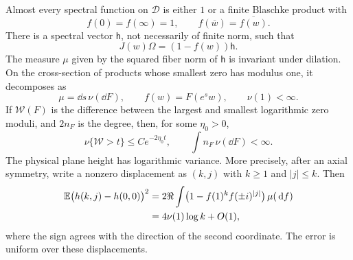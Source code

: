 \begin{proposition}\label{prop:spectral}
Almost every spectral function on $\mathcal D$ is either $1$ or a
finite Blaschke product with
\begin{equation}\label{eq:finite-spectral-inner}
 f(0)=f(\infty)=1,
 \qquad f(\overline w)=\overline{f(w)}.
\end{equation}
There is a spectral vector $\mathsf h$, not necessarily of finite
norm, such that
\begin{equation}\label{eq:current-cocycle}
 J(w)\Omega=(1-f(w))\mathsf h.
\end{equation}
The measure $\mu$ given by the squared fiber norm of $\mathsf h$
is invariant under dilation.  On the cross-section of products whose
smallest zero has modulus one, it decomposes as
\begin{equation}\label{eq:current-disintegration}
 \mu=\dd s\,\nu(\dd F),\qquad f(w)=F(e^s w),
 \qquad \nu(1)<\infty.
\end{equation}
If $\mathcal W(F)$ is the difference between the largest and smallest
logarithmic zero moduli, and $2n_F$ is the degree, then, for some
$\eta_0>0$,
\begin{equation}\label{eq:current-width-tail}
 \nu\{\mathcal W>t\}\le C e^{-2\eta_0t},\qquad
 \int n_F\,\nu(\dd F)<\infty.
\end{equation}
The physical plane height has logarithmic variance.  More precisely,
after an axial symmetry, write a nonzero displacement as $(k,j)$ with
$k\ge1$ and $|j|\le k$.  Then
\begin{equation}\label{eq:spectral-variogram}
 \begin{split}
 \mathbb E\bigl(h(k,j)-h(0,0)\bigr)^2
 &=2\Re\int\bigl(1-f(1)^k f(\pm i)^{|j|}\bigr)\,\mu(\,\mathrm d f)\\
 &=4\nu(1)\log k+O(1),
 \end{split}
\end{equation}
where the sign agrees with the direction of the second coordinate.
The error is uniform over these displacements.
\end{proposition}

